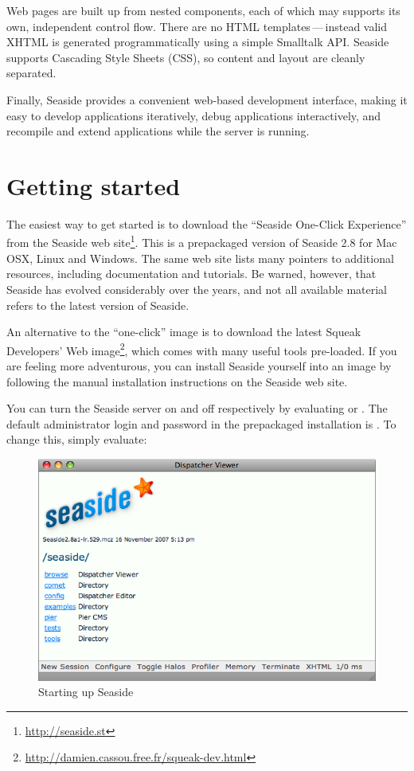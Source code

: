 \documentclass[a4paper,10pt,twoside]{book}
\begin{document}
Web pages are built up from nested components, each of which may supports its own, independent control flow.
There are no HTML templates\,---\,instead valid XHTML is generated programmatically using a simple Smalltalk API.
Seaside supports Cascading Style Sheets (CSS), so content and layout are cleanly separated.

Finally, Seaside provides a convenient web-based development interface, making it easy to develop applications iteratively, debug applications interactively, and recompile and extend applications while the server is running.

\section{Getting started}

The easiest way to get started is to download the ``Seaside One-Click Experience'' from the Seaside web site\footnote{\url{http://seaside.st}}.
This is a prepackaged version of Seaside 2.8 for Mac OSX, Linux and Windows.
The same web site lists many pointers to additional resources, including documentation and tutorials.
Be warned, however, that Seaside has evolved considerably over the years, and not all available material refers to the latest version of Seaside.

An alternative to the ``one-click'' image is to download the latest Squeak Developers' Web image\footnote{\url{http://damien.cassou.free.fr/squeak-dev.html}}, which comes with many useful tools pre-loaded.
If you are feeling more adventurous, you can install Seaside yourself into an image by following the manual installation instructions on the Seaside web site.

You can turn the Seaside server on and off respectively by evaluating
or
.
The default administrator login and password in the prepackaged installation is .
To change this, simply evaluate: 

\begin{figure}[ht]
\begin{center}
\includegraphics[width=\textwidth]{seasideStartup}
\caption{Starting up Seaside}
\label{fig:seasideStartup}
\end{center}
\end{figure}
\end{document}
